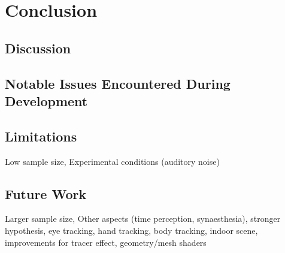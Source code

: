 \chapter{Conclusion}

\section{Discussion}

\section{Notable Issues Encountered During Development}

\section{Limitations}
Low sample size, Experimental conditions (auditory noise)

\section{Future Work}
Larger sample size, Other aspects (time perception, synaesthesia), stronger hypothesis, eye tracking, hand tracking, body tracking, indoor scene, improvements for tracer effect, geometry/mesh shaders
